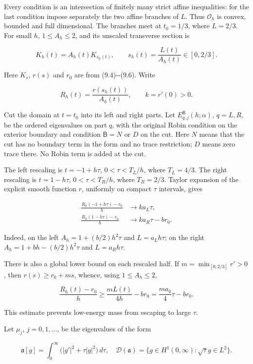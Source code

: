 \documentclass[11pt]{article}
\begin{document}
Every condition is an intersection of finitely many strict affine
inequalities: for the last condition impose separately the two affine
branches of \(L\). Thus \(\mathcal O_h\) is convex, bounded and full
dimensional. The branches meet at \(t_0=1/3\), where \(L=2/3\). For
small \(h\), \(1\le A_h\le2\), and its unscaled transverse section is

\[
K_h(t)=A_h(t)K_{s_h(t)},\qquad
s_h(t)=\frac{L(t)}{A_h(t)}\in[0,2/3].
\tag{11.4}
\]

Here \(K_s\), \(r(s)\) and \(r_0\) are from (9.4)-\/-(9.6). Write

\[
R_h(t)=\frac{r(s_h(t))}{A_h(t)},
\qquad k=r'(0)>0.
\tag{11.5}
\]

Cut the domain at \(t=t_0\) into its left and right parts. Let
\(E_{q,j}^{\mathsf B}(h;\alpha)\), \(q=L,R\), be the ordered eigenvalues
on part \(q\), with the original Robin condition on the exterior
boundary and condition \(\mathsf B=N\) or \(D\) on the cut. Here \(N\)
means that the cut has no boundary term in the form and no trace
restriction; \(D\) means zero trace there. No Robin term is added at the
cut.

The left rescaling is \(t=-1+h\tau\), \(0<\tau<T_L/h\), where
\(T_L=4/3\). The right rescaling is \(t=1-h\tau\), \(0<\tau<T_R/h\),
where \(T_R=2/3\). Taylor expansion of the explicit smooth function
\(r\), uniformly on compact \(\tau\) intervals, gives

\[
\begin{aligned}
\frac{R_h(-1+h\tau)-r_0}{h}&\longrightarrow k a_L\tau,\\
\frac{R_h(1-h\tau)-r_0}{h}&\longrightarrow k a_R\tau-br_0.
\end{aligned}
\tag{11.6}
\]

Indeed, on the left \(A_h=1+(b/2)h^2\tau\) and \(L=a_Lh\tau\); on the
right \(A_h=1+bh-(b/2)h^2\tau\) and \(L=a_Rh\tau\).

There is also a global lower bound on each rescaled half. If
\(m=\min_{[0,2/3]}r'>0\), then \(r(s)\ge r_0+ms\), whence, using
\(1\le A_h\le2\),

\[
\frac{R_h(t)-r_0}{h}
\ge \frac{m L(t)}{4h}-br_0
=\frac{m a_q}4\tau-br_0.
\tag{11.7}
\]

This estimate prevents low-energy mass from escaping to large \(\tau\).

Let \(\mu_j\), \(j=0,1,\ldots\), be the eigenvalues of the form

\[
\mathfrak a[g]=\int_0^\infty\bigl(|g'|^2+\tau|g|^2\bigr)\,d\tau,
\quad
\mathcal D(\mathfrak a)=\{g\in H^1(0,\infty):\sqrt\tau g\in L^2\}.
\tag{11.8}
\]
\end{document}
